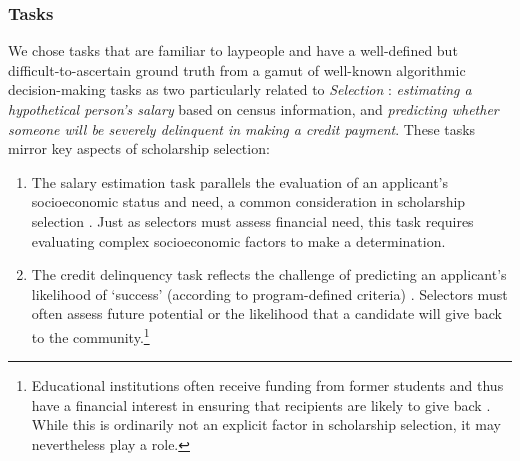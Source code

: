 
\subsubsection{Tasks}\label{ssec:tasks}
We chose tasks that are familiar to laypeople and have a well-defined but difficult-to-ascertain ground truth from a gamut of well-known algorithmic decision-making tasks as two particularly related to \emph{Selection} \cite{10.1111/j.1467-954X.2007.00740.x,Pasquale_2006,Latzer_Hollnbuchner_Just_Saurwein_2014}: \emph{estimating a hypothetical person's salary} based on census information, and \emph{predicting whether someone will be severely delinquent in making a credit payment}. These tasks mirror key aspects of scholarship selection:

\begin{enumerate}
    \item The salary estimation task parallels the evaluation of an applicant's socioeconomic status and need, a common consideration in scholarship selection \cite{Warikoo_2019}. Just as selectors must assess financial need, this task requires evaluating complex socioeconomic factors to make a determination.
    \item The credit delinquency task reflects the challenge of predicting an applicant's likelihood of `success' (according to program-defined criteria) \cite{schumann2017diverse}. Selectors must often assess future potential or the likelihood that a candidate will give back to the community.\footnote{Educational institutions often receive funding from former students and thus have a financial interest in ensuring that recipients are likely to give back \cite{Stephenson_Yerger_2014}. While this is ordinarily not an explicit factor in scholarship selection, it may nevertheless play a role.}
\end{enumerate}

